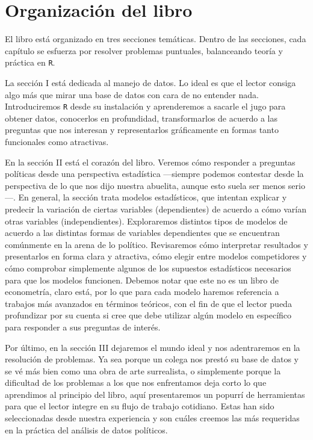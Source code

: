 \documentclass[]{book}
\begin{document}
\hypertarget{organizacion-del-libro}{%
\section{Organización del libro}\label{organizacion-del-libro}}

El libro está organizado en tres secciones temáticas. Dentro de las
secciones, cada capítulo se esfuerza por resolver problemas puntuales,
balanceando teoría y práctica en \texttt{R}.

 La sección I está dedicada al manejo de datos. Lo ideal es que el
lector consiga algo más que mirar una base de datos con cara de no
entender nada. Introduciremos \texttt{R} desde su instalación y
aprenderemos a sacarle el jugo para obtener datos, conocerlos en
profundidad, transformarlos de acuerdo a las preguntas que nos interesan
y representarlos gráficamente en formas tanto funcionales como
atractivas.

 En la sección II está el corazón del libro. Veremos cómo responder a
preguntas políticas desde una perspectiva estadística ---siempre podemos
contestar desde la perspectiva de lo que nos dijo nuestra abuelita,
aunque esto suela ser menos serio---. En general, la sección trata
modelos estadísticos, que intentan explicar y predecir la variación de
ciertas variables (dependientes) de acuerdo a cómo varían otras
variables (independientes). Exploraremos distintos tipos de modelos de
acuerdo a las distintas formas de variables dependientes que se
encuentran comúnmente en la arena de lo político. Revisaremos cómo
interpretar resultados y presentarlos en forma clara y atractiva, cómo
elegir entre modelos competidores y cómo comprobar simplemente algunos
de los supuestos estadísticos necesarios para que los modelos funcionen.
Debemos notar que este no es un libro de econometría, claro está, por lo
que para cada modelo haremos referencia a trabajos más avanzados en
términos teóricos, con el fin de que el lector pueda profundizar por su
cuenta si cree que debe utilizar algún modelo en específico para
responder a sus preguntas de interés.

 Por último, en la sección III dejaremos el mundo ideal y nos
adentraremos en la resolución de problemas. Ya sea porque un colega nos
prestó su base de datos y se vé más bien como una obra de arte
surrealista, o simplemente porque la dificultad de los problemas a los
que nos enfrentamos deja corto lo que aprendimos al principio del libro,
aquí presentaremos un popurrí de herramientas para que el lector integre
en su flujo de trabajo cotidiano. Estas han sido seleccionadas desde
nuestra experiencia y son cuáles creemos las más requeridas en la
práctica del análisis de datos políticos.
\end{document}

